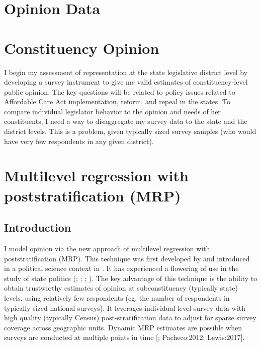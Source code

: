 \documentclass[
  oneside]{book}
\begin{document}
\hypertarget{opinion-data}{%
\section{Opinion Data}\label{opinion-data}}

\hypertarget{constituency-opinion}{%
\section{Constituency Opinion}\label{constituency-opinion}}

I begin my assessment of representation at the state legislative district level by developing a survey instrument to give me valid estimates of constituency-level public opinion. The key questions will be related to policy issues related to Affordable Care Act implementation, reform, and repeal in the states. To compare individual legislator behavior to the opinion and needs of her constituents, I need a way to disaggregate my survey data to the state and the district levels. This is a problem, given typically sized survey samples (who would have very few respondents in any given district).

\hypertarget{multilevel-regression-with-poststratification-mrp}{%
\section{Multilevel regression with poststratification (MRP)}\label{multilevel-regression-with-poststratification-mrp}}

\hypertarget{introduction}{%
\subsection{Introduction}\label{introduction}}

I model opinion via the new approach of multilevel regression with poststratification (MRP). This technique was first developed by \citet{Gelman:1997} and introduced in a political science context in \citet{Park:2004}. It has experienced a flowering of use in the study of state politics (\citet{Lax:2009}; \citet{Lax:2009b}; \citet{Kastellec:2010}; \citet{Pacheco:2011}). The key advantage of this technique is the ability to obtain trustworthy estimates of opinion at subconstituency (typically state) levels, using relatively few respondents (eg, the number of respondents in typically-sized national surveys). It leverages individual level survey data with high quality (typically Census) post-stratification data to adjust for sparse survey coverage across geographic units. Dynamic MRP estimates are possible when surveys are conducted at multiple points in time {[}\citet{Pacheco:2011}; Pacheco:2012; Lewis:2017{]}.
\end{document}
